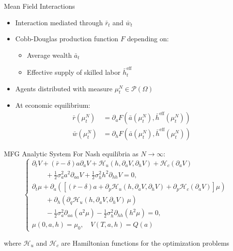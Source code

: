 \documentclass[xcolor=dvipsnames,t,aspectratio=170]{beamer} %
\newcommand{\HH}{\mathcal{H}}
\newcommand{\heff}{\bar h^{\text{eff}}}
\begin{document}
\begin{frame}{Mean Field Interactions}
\begin{itemize}
    \item Interaction mediated through $\bar r_t$ and $\bar w_t$
    \item Cobb-Douglas production function $F$ depending on:
    \begin{itemize}
        \item Average wealth $\bar a_t$
        \item Effective supply of skilled labor $\heff_t$
    \end{itemize}
    \item Agents distributed with measure $\mu^N_t \in \mathcal{P}(\Omega)$
    \item At economic equilibrium:
    \begin{align}
        \bar r(\mu^N_t) &= \partial_a F(\bar a(\mu^N_t), \heff(\mu^N_t))\\
        \bar w(\mu^N_t) &= \partial_h F(\bar a(\mu^N_t), \heff(\mu^N_t))
    \end{align}
\end{itemize}
\end{frame}

\begin{frame}{MFG Analytic System}
For Nash equilibria as $N \to \infty$:
\begin{equation}
    \begin{cases}
        \partial_t V + (\bar r  - \delta) a \partial_a V + \HH_u(h, \partial_a V, \partial_h V)  + \HH_c(\partial_a V) \\
        \quad\quad + \frac{1}{2} \sigma_a^2 a^2 \partial_{aa} V + \frac{1}{2} \sigma^2_h h^2 \partial_{hh} V = 0,\\
        \partial_t \mu + \partial_a \left( \left[ (\bar r - \delta) a + \partial_p \HH_u(h, \partial_a V, \partial_h V) + \partial_p \HH_c(\partial_a V) \right] \mu \right) \\
        \quad\quad + \partial_h \left( \partial_q \HH_u(h, \partial_a V, \partial_h V)\, \mu\right) \\
        \quad\quad - \frac{1}{2} \sigma_a^2 \partial_{aa} (a^2\mu) - \frac{1}{2} \sigma^2_h \partial_{hh} (h^2\mu) = 0,\\
        \mu(0,a,h) = \mu_0,\quad V(T,a,h) = Q(a)
    \end{cases}
\end{equation}

where $\HH_u$ and $\HH_c$ are Hamiltonian functions for the optimization problems
\end{frame}
\end{document}
